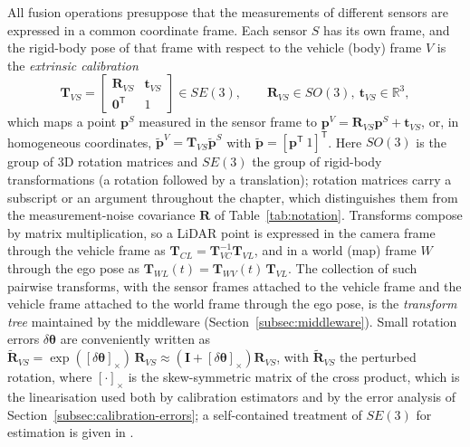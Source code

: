 All fusion operations presuppose that the measurements of different sensors are expressed in a common coordinate frame. Each sensor $S$ has its own frame, and the rigid-body pose of that frame with respect to the vehicle (body) frame $V$ is the \emph{extrinsic calibration}
\begin{equation}
\mathbf{T}_{V\!S}=
\begin{bmatrix}
\mathbf{R}_{V\!S} & \mathbf{t}_{V\!S}\\
\mathbf{0}^{\mathsf T} & 1
\end{bmatrix}\in SE(3),
\qquad
\mathbf{R}_{V\!S}\in SO(3),\ \mathbf{t}_{V\!S}\in\mathbb{R}^{3},
\label{eq:extrinsic-se3}
\end{equation}
which maps a point $\mathbf{p}^{S}$ measured in the sensor frame to $\mathbf{p}^{V}=\mathbf{R}_{V\!S}\mathbf{p}^{S}+\mathbf{t}_{V\!S}$, or, in homogeneous coordinates, $\tilde{\mathbf{p}}^{V}=\mathbf{T}_{V\!S}\tilde{\mathbf{p}}^{S}$ with $\tilde{\mathbf{p}}=[\mathbf{p}^{\mathsf T}\ 1]^{\mathsf T}$. Here $SO(3)$ is the group of 3D rotation matrices and $SE(3)$ the group of rigid-body transformations (a rotation followed by a translation); rotation matrices carry a subscript or an argument throughout the chapter, which distinguishes them from the measurement-noise covariance $\mathbf{R}$ of Table~\ref{tab:notation}. Transforms compose by matrix multiplication, so a LiDAR point is expressed in the camera frame through the vehicle frame as $\mathbf{T}_{C\!L}=\mathbf{T}_{V\!C}^{-1}\mathbf{T}_{V\!L}$, and in a world (map) frame $W$ through the ego pose as $\mathbf{T}_{W\!L}(t)=\mathbf{T}_{W\!V}(t)\,\mathbf{T}_{V\!L}$. The collection of such pairwise transforms, with the sensor frames attached to the vehicle frame and the vehicle frame attached to the world frame through the ego pose, is the \emph{transform tree} maintained by the middleware (Section~\ref{subsec:middleware}). Small rotation errors $\delta\boldsymbol{\theta}$ are conveniently written as $\widetilde{\mathbf{R}}_{V\!S}=\exp([\delta\boldsymbol{\theta}]_{\times})\,\mathbf{R}_{V\!S}\approx(\mathbf{I}+[\delta\boldsymbol{\theta}]_{\times})\mathbf{R}_{V\!S}$, with $\widetilde{\mathbf{R}}_{V\!S}$ the perturbed rotation, where $[\cdot]_{\times}$ is the skew-symmetric matrix of the cross product, which is the linearisation used both by calibration estimators and by the error analysis of Section~\ref{subsec:calibration-errors}; a self-contained treatment of $SE(3)$ for estimation is given in \cite{barfoot2017_state_estimation,sola2018_microlie}.

